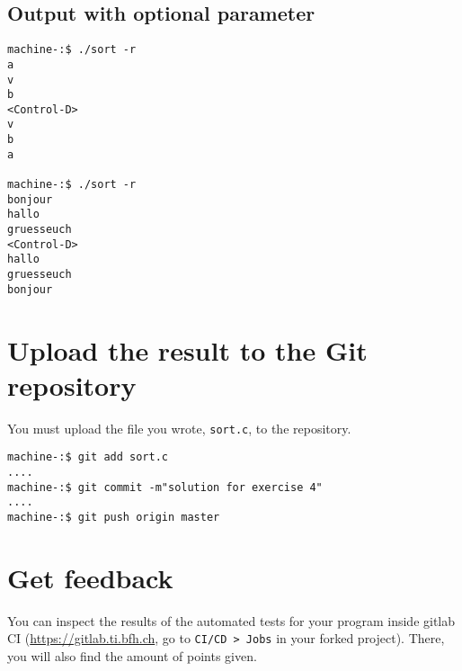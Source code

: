 \documentclass{scrartcl}
\begin{document}
\subsection{Output with optional parameter}

\begin{lstlisting}
machine-:$ ./sort -r
a
v
b
<Control-D>
v
b
a

machine-:$ ./sort -r
bonjour
hallo
gruesseuch
<Control-D>
hallo
gruesseuch
bonjour
\end{lstlisting}

\section{Upload the result to the Git repository}
You must upload the file you wrote, \texttt{sort.c}, to the repository.

\begin{lstlisting}
machine-:$ git add sort.c
....
machine-:$ git commit -m"solution for exercise 4"
....
machine-:$ git push origin master
\end{lstlisting}%

\section{Get feedback}
You can inspect the results of the automated tests for your program inside gitlab CI (\url{https://gitlab.ti.bfh.ch}, go to \texttt{CI/CD > Jobs} in your forked project). There, you will also find the amount of points given.
\end{document}
